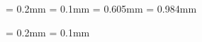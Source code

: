\makeatletter
\renewcommand\paragraph{\@startsection{paragraph}{4}{\z@}{0.2ex}{-1em}{\normalfont\normalsize\bfseries}}
\makeatother

\newcommand{\midsepremove}{\aboverulesep = 0.2mm \belowrulesep = 0.1mm}
\midsepremove
\newcommand{\midsepdefault}{\aboverulesep = 0.605mm \belowrulesep = 0.984mm}
\midsepdefault

\midsepremove
\newif\iffindingbox
\findingboxtrue


\usepackage[accsupp]{axessibility}  %



%

\usepackage{hyperref}

\usepackage{orcidlink}


